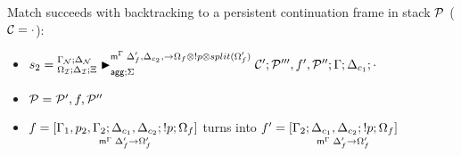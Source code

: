 \item Match succeeds with backtracking to a persistent continuation frame
in stack $\lstack{P}$ ($\lstack{C} = \cdot$):
\begin{itemize}[leftmargin=\secondm]
   \item $s_2 = \matstatea{\deltan}{\lstack{C'}; \lstack{P'''}, f', \lstack{P''}}
         {\Gamma}{\Delta_{c_1}}{\cdot}{\Delta'_f, \Delta_{c_2}, 
         \rightarrow \Omega_f \otimes \bang p \otimes split(\Omega'_f)}{\Sigma}$

   \item $\lstack{P} = \lstack{P'}, f, \lstack{P''}$

   \item $f = \pframe{\Gamma_1, p_2,
      \Gamma_2}{\Delta_{c_1}, \Delta_{c_2}}{\bang p}{\Omega_f}{\Delta'_f}{\Omega'_f}$
   turns into $f' = \pframe{\Gamma_2}{\Delta_{c_1},
      \Delta_{c_2}}{\bang p}{\Omega_f}{\Delta'_f}{\Omega'_f}$

\end{itemize}
